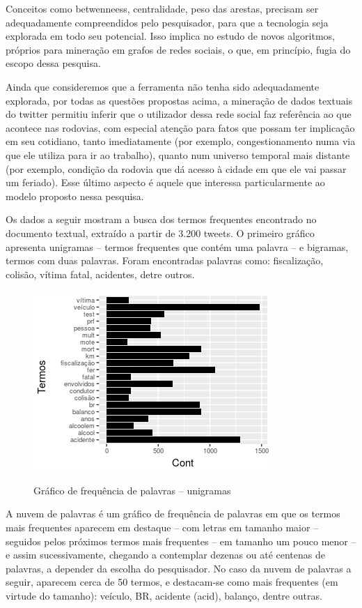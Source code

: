Conceitos como betwenneess, centralidade, peso das arestas, precisam ser adequadamente compreendidos pelo pesquisador, para que a tecnologia seja explorada em todo seu potencial. Isso implica no estudo de novos algoritmos, próprios para mineração em grafos de redes sociais, o que, em princípio, fugia do escopo dessa pesquisa.

Ainda que consideremos que a ferramenta não tenha sido adequadamente explorada, por todas as questões propostas acima, a mineração de dados textuais do twitter permitiu inferir que o utilizador dessa rede social faz referência ao que acontece nas rodovias, com especial atenção para fatos que possam ter implicação em seu cotidiano, tanto imediatamente (por exemplo, congestionamento numa via que ele utiliza para ir ao trabalho), quanto num universo temporal mais distante (por exemplo, condição da rodovia que dá acesso à cidade em que ele vai passar um feriado). Esse último aspecto é aquele que interessa particularmente ao modelo proposto nessa pesquisa.

Os dados a seguir mostram a busca dos termos frequentes encontrado no documento textual, extraído a partir de 3.200 tweets. O primeiro gráfico apresenta unigramas -- termos frequentes que contém uma palavra -- e bigramas, termos com duas palavras. Foram encontradas palavras como: fiscalização, colisão, vítima fatal, acidentes, detre outros. 

\pagebreak

\begin{figure}
\centering
\caption{Gráfico de frequência de palavras -- unigramas}
\includegraphics[width=0.7\linewidth]{Figuras/Twitter/freqPalavr}
\label{fig:freqPalavras}
\end{figure}

\quad

A nuvem de palavras é um gráfico de frequência de palavras em que os termos mais frequentes aparecem em destaque -- com letras em tamanho maior -- seguidos pelos próximos termos mais frequentes -- em tamanho um pouco menor -- e assim sucessivamente, chegando a contemplar dezenas ou até centenas de palavras, a depender da escolha do pesquisador. No caso da nuvem de palavras a seguir, aparecem cerca de 50 termos, e destacam-se como mais frequentes (em virtude do tamanho): veículo, BR, acidente (acid), balanço, dentre outras. 


